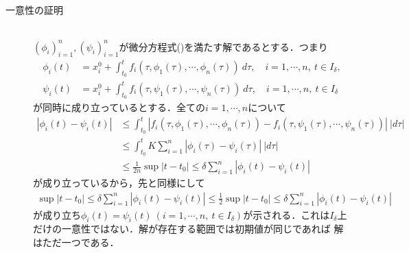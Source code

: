 \begin{prf}
\begin{description}
		\item[一意性の証明]\mbox{}\\
			$(\phi_i)_{i=1}^{n}, (\psi_i)_{i=1}^{n}$が微分方程式()を満たす解であるとする．つまり
			\begin{align}
				\phi_i(t) &= x_i^0 + \int_{t_0}^t f_i(\tau,\phi_1(\tau), \cdots, \phi_n(\tau))\ d\tau, \quad i=1,\cdots,n,\ t \in I_\delta, \\
				\psi_i(t) &= x_i^0 + \int_{t_0}^t f_i(\tau,\psi_1(\tau), \cdots, \psi_n(\tau))\ d\tau, \quad i=1,\cdots,n,\ t \in I_\delta
			\end{align}
			が同時に成り立っているとする．全ての$i = 1,\cdots,n$について
			\begin{align}
				|\phi_i(t) - \psi_i(t)| &\leq \int_{t_0}^t |f_i(\tau,\phi_1(\tau), \cdots, \phi_n(\tau)) - f_i(\tau,\psi_1(\tau), \cdots, \psi_n(\tau))|\ |d\tau| \\
				&\leq \int_{t_0}^t K \sum_{i=1}^n |\phi_i(\tau) - \psi_i(\tau)|\ |d\tau| \\
				&\leq \frac{1}{2n} \sup{|t - t_0|\leq \delta}{\sum_{i=1}^n |\phi_i(t) - \psi_i(t)|}
			\end{align}
			が成り立っているから，先と同様にして
			\begin{align}
				\sup{|t - t_0|\leq \delta}{\sum_{i=1}^n |\phi_i(t) - \psi_i(t)|} \leq \frac{1}{2} \sup{|t - t_0|\leq \delta}{\sum_{i=1}^n |\phi_i(t) - \psi_i(t)|}
			\end{align}
			が成り立ち$\phi_i(t) = \psi_i(t) \ (i=1,\cdots,n,\ t \in I_\delta)$が示される．これは$I_\delta$上だけの一意性ではない．解が存在する範囲では初期値が同じであれば
			解はただ一つである．
			\QED
	\end{description}
	\end{prf}